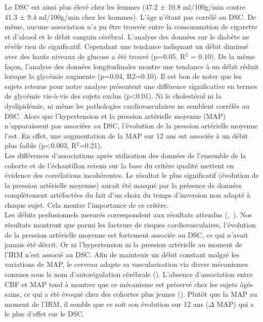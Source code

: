 Le DSC est ainsi plus élevé chez les femmes (47.2 ± 10.8 ml/100g/min contre 41.3 ± 9.4
ml/100g/min chez les hommes). L’âge n’étant pas corrélé au DSC. De même, aucune association n’a
pu être trouvée entre la consommation de cigarette et d’alcool et le débit sanguin cérébral. L’analyse
des données sur le diabète ne révèle rien de significatif. Cependant une tendance indiquant un débit
diminué avec des hauts niveaux de glucose a été trouvé (p=0.05, R$^2$ = 0.10). De la même façon, l’analyse
des données longitudinales montre une tendance à un débit réduit lorsque la glycémie augmente
(p=0.04, R2=0.10). Il est bon de noter que les sujets retenus pour notre analyse présentent une
différence significative en termes de glycémie vis-à-vis des sujets exclus (p<0.01). Ni le cholestérol ni
la dyslipidémie, ni même les pathologies cardiovasculaires ne semblent corrélés au DSC. Alors que
l’hypertension et la pression artérielle moyenne (MAP) n’apparaissent pas associées au DSC,
l’évolution de la pression artérielle moyenne l’est. En effet, une augmentation de la MAP sur 12 ans
est associée à un débit plus faible (p<0.003, R$^2$=0.21).\\
Les différences d’associations après utilisation des données de l’ensemble de la cohorte et de
l’échantillon retenu sur la base du critère qualité mettent en évidence des corrélations incohérentes.
Le résultat le plus significatif (évolution de la pression artérielle moyenne) aurait été masqué par la
présence de données complètement artéfactées du fait d’un choix du temps d’inversion non adapté à
chaque sujet. Cela montre l’importance de ce critère.\\
Les débits perfusionnels mesurés correspondent aux résultats attendus (\cite{Chen2011},~\cite{Brumm2010}). Nos
résultats montrent que parmi les facteurs de risques cardiovasculaires, l’évolution de la pression
artérielle moyenne est fortement associée au DSC, ce qui n’avait jamais été décrit. Or ni l’hypertension
ni la pression artérielle au moment de l’IRM n’est associé au DSC. Afin de maintenir un débit constant
malgré les variations de MAP, le cerveau adapte sa vascularisation via divers mécanismes connues sous
le nom d’autorégulation cérébrale (\cite{Paulson1990}). L’absence d’association entre CBF et MAP tend à montrer que
ce mécanisme est préservé chez les sujets âgés sains, ce qui a été évoqué chez des cohortes plus jeunes
(\cite{Vanbeek2008}). Plutôt que la MAP au moment de l’IRM, il semble que ce soit son évolution sur 12 ans ($\Delta$ MAP)
qui a le plus d’effet sur le DSC.\\
